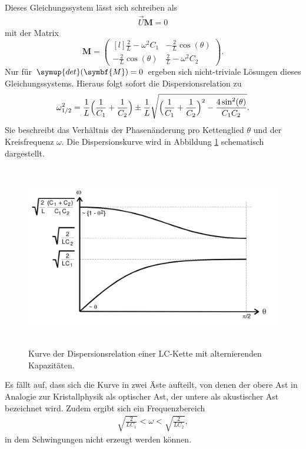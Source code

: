 Dieses Gleichungssystem lässt sich schreiben als
\begin{align*}
  \vec{U} \symbf{M} = 0
\end{align*}
mit der Matrix
\begin{equation}
  \symbf{M} =
  \begin{pmatrix*}[l]
    \frac{2}{L} - \omega^2 C_1 & -\frac{2}{L} \cos{(\theta)} \\
    -\frac{2}{L} \cos{(\theta)} & \frac{2}{L} - \omega^2 C_2
  \end{pmatrix*}.
\end{equation}
Nur für $\symup{det}(\symbf{M})=0$ ergeben sich nicht-triviale Lösungen dieses Gleichungssystems.
Hieraus folgt sofort die Dispersionsrelation zu
\begin{equation}
  \label{eqn:dispersion}
  \omega_{1/2}^2 = \frac{1}{L} \Bigl( \frac{1}{C_1} + \frac{1}{C_2} \Bigr) \pm \frac{1}{L} \sqrt{ \Bigl( \frac{1}{C_1} + \frac{1}{C_2} \Bigr)^2 - \frac{4 \sin^2 \! {\left(\theta \right)}}{C_1 C_2} }.
\end{equation}
Sie beschreibt das Verhältnis der Phasenänderung pro Kettenglied $\theta$ und der Kreisfrequenz $\omega$.
Die Dispersionskurve wird in Abbildung \ref{tfig:2} schematisch dargestellt.
\begin{figure}[H]
  \centering
  \includegraphics[height=8cm]{dispersionskurve.png}
  \caption{Kurve der Dispersionsrelation einer LC-Kette mit alternierenden Kapazitäten.}
  \label{tfig:2}
\end{figure}
Es fällt auf, dass sich die Kurve in zwei Äste aufteilt, von denen der obere Ast in Analogie zur Kristallphysik als optischer Ast, der untere als akustischer Ast bezeichnet wird.
Zudem ergibt sich ein Frequenzbereich
\begin{align*}
  \sqrt{\frac{2}{LC_1}} < \omega < \sqrt{\frac{2}{LC_2}},
\end{align*}
in dem Schwingungen nicht erzeugt werden können.
